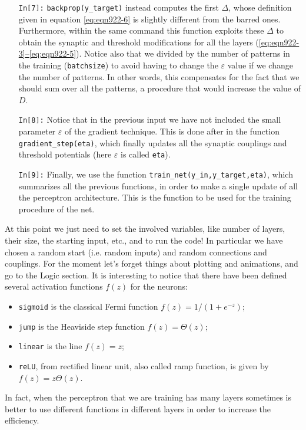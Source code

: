 \begin{itemize}[align=left,labelwidth=,labelsep=5.475pt,leftmargin=\dimexpr{}+]
\item[\texttt{In[7]:}] \texttt{backprop(y\_target)} instead computes the first $\Delta$, whose definition given in equation \eqref{eq:eqn922-6} is slightly different from the barred ones. Furthermore, within the same command this function exploits these $\Delta$ to obtain the synaptic and threshold modifications for all the layers (\hyperref[eq:eqn922-3]{\ref*{eq:eqn922-3}--\ref*{eq:eqn922-5}}). Notice also that we divided by the number of patterns in the training (\texttt{batchsize}) to avoid having to change the $\varepsilon$ value if we change the number of patterns. In other words, this compensates for the fact that we should sum over all the patterns, a procedure that would increase the value of $D$.
\item[\texttt{In[8]:}] Notice that in the previous input we have not included the small parameter $\varepsilon$ of the gradient technique. This is done after in the function \texttt{gradient\_step(eta)}, which finally updates all the synaptic couplings and threshold potentials (here $\varepsilon$ is called \texttt{eta}).
\item[\texttt{In[9]:}] Finally, we use the function \texttt{train\_net(y\_in,y\_target,eta)}, which summarizes all the previous functions, in order to make a single update of all the perceptron architecture. This is the function to be used for the training procedure of the net.
\end{itemize}
At this point we just need to set the involved variables, like number of layers, their size, the starting input, etc., and to run the code! In particular we have chosen a random start (i.e. random inputs) and random connections and couplings. For the moment let's forget things about plotting and animations, and go to the \textsf{Logic} section. It is interesting to notice that there have been defined several activation functions $f(z)$ for the neurons:
\begin{itemize}
\item \texttt{sigmoid} is the classical Fermi function $f(z)=1/(1+e^{-z})$;
\item \texttt{jump} is the Heaviside step function $f(z)=\Theta(z)$;
\item \texttt{linear} is the line $f(z)=z$;
\item \texttt{reLU}, from rectified linear unit, also called ramp function, is given by $f(z)=z\Theta(z)$.
\end{itemize}
In fact, when the perceptron that we are training has many layers sometimes is better to use different functions in different layers in order to increase the efficiency.

